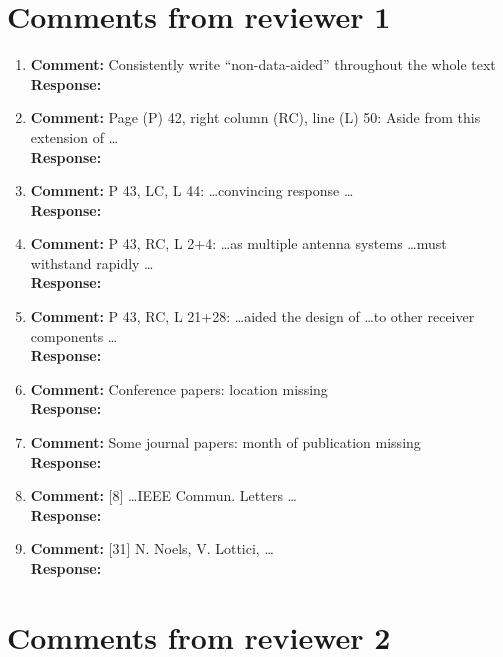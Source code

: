 \documentclass{article}
\begin{document}
\section{Comments from reviewer 1}

\begin{enumerate}

\item \textbf{Comment:} Consistently write ``non-data-aided'' throughout the whole text \\
\textbf{Response:}

\item \textbf{Comment:} Page (P) 42, right column (RC), line (L) 50: Aside from this extension of \dots \\
\textbf{Response:} 


\item \textbf{Comment:} P 43, LC, L 44: \dots convincing response \dots \\
\textbf{Response:}

\item \textbf{Comment:} P 43, RC, L 2+4: \dots as multiple antenna systems \dots must withstand rapidly \dots \\
\textbf{Response:}

\item \textbf{Comment:} P 43, RC, L 21+28: \dots aided the design of \dots to other receiver components \dots \\
\textbf{Response:}

\item \textbf{Comment:} Conference papers: location missing \\
\textbf{Response:}

\item \textbf{Comment:} Some journal papers: month of publication missing \\
\textbf{Response:}

\item \textbf{Comment:} [8] \dots IEEE Commun. Letters \dots \\
\textbf{Response:}

\item \textbf{Comment:} [31] N. Noels, V. Lottici, \dots \\
\textbf{Response:}

\end{enumerate}

\section{Comments from reviewer 2}
\end{document}
